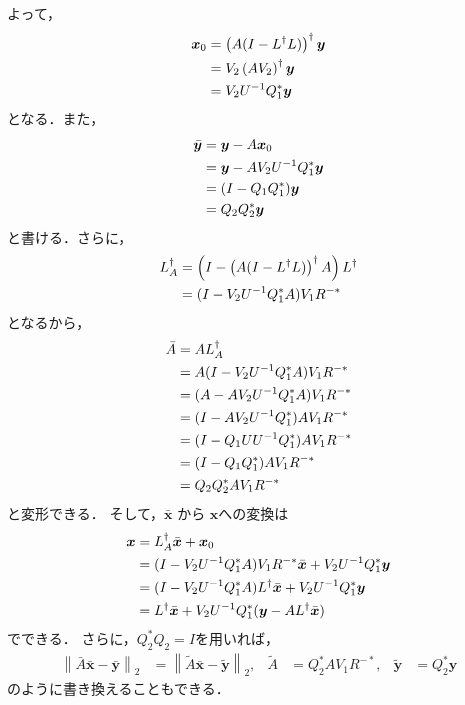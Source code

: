 よって，
\begin{align}
    \bm{x}_0 & = \left(A (I - L^\dagger L)\right)^\dagger \bm{y} \notag \\
             & = V_2 \left(A V_2\right)^\dagger \bm{y} \notag           \\
             & = V_2 U^{-1} Q_1^* \bm{y}
\end{align}
となる．また，
\begin{align}
    \bar{\bm{y}} & = \bm{y} - A \bm{x}_0 \notag                \\
                 & = \bm{y} - A V_2 U^{-1} Q_1^* \bm{y} \notag \\
                 & = (I - Q_1 Q_1^*) \bm{y} \notag             \\
                 & = Q_2 Q_2^* \bm{y}
\end{align}
と書ける．さらに，
\begin{align}
    L_A^\dagger & = \left(I - \left(A (I - L^\dagger L)\right)^\dagger A\right)L^\dagger \notag \\
                & = (I - V_2 U^{-1} Q_1^* A) V_1 R^{-*}
\end{align}
となるから，
\begin{align}
    \bar{A} & = A L_A^\dagger \notag                         \\
            & = A (I - V_2 U^{-1} Q_1^* A) V_1 R^{-*} \notag \\
            & = (A - A V_2 U^{-1} Q_1^* A) V_1 R^{-*} \notag \\
            & = (I - A V_2 U^{-1} Q_1^*) A V_1 R^{-*} \notag \\
            & = (I - Q_1 U U^{-1} Q_1^*) A V_1 R^{-*} \notag \\
            & = (I - Q_1 Q_1^*) A V_1 R^{-*} \notag          \\
            & = Q_2 Q_2^* A V_1 R^{-*}
\end{align}
と変形できる．
そして，$\bar{\bm{x}}$ から $\bm{x}$への変換は
\begin{align}
    \bm{x} & = L_A^\dagger \bar{\bm{x}} + \bm{x}_0 \notag                                        \\
           & = (I - V_2 U^{-1} Q_1^* A) V_1 R^{-*} \bar{\bm{x}} + V_2 U^{-1} Q_1^* \bm{y} \notag \\
           & = (I - V_2 U^{-1} Q_1^* A) L^\dagger \bar{\bm{x}} + V_2 U^{-1} Q_1^* \bm{y} \notag  \\
           & = L^\dagger \bar{\bm{x}} + V_2 U^{-1} Q_1^* (\bm{y} - A L^\dagger \bar{\bm{x}})
\end{align}
でできる．
さらに，$Q_2^* Q_2 = I$を用いれば，
\begin{align}
    \left\|\bar{A} \bar{\bm{x}} - \bar{\bm{y}}\right\|_2
                   & = \left\|\tilde{A} \bar{\bm{x}} - \tilde{\bm{y}}\right\|_2, &
    \tilde{A}      & = Q_2^* A V_1 R^{-*},                                       &
    \tilde{\bm{y}} & = Q_2^* \bm{y}
\end{align}
のように書き換えることもできる．

